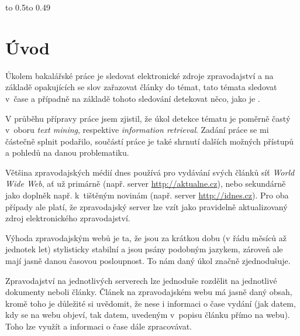 \documentclass[12pt,a4paper]{report}
\let\openright=\clearpage
\begin{document}
\vbox to 0.5\vsize{
\setlength\parindent{0mm}
\setlength\parskip{5mm}

\kecycz{}

\vss}\nobreak\vbox to 0.49\vsize{
\setlength\parindent{0mm}
\setlength\parskip{5mm}

\kecyen{}

\vss}




\newpage


\openright
\pagestyle{plain}
\setcounter{page}{1}
\tableofcontents

\chapter{Úvod}

Úkolem bakalářské práce je sledovat elektronické zdroje zpravodajství a na zá\-klad\-ě opakujících se slov zařazovat články do témat, tato témata sledovat v~čase a případně na základě tohoto sledování detekovat něco, jako je .

V průběhu přípravy práce jsem zjistil, že úkol detekce tématu je poměrně častý v~oboru \emph{text mining}, respektive \emph{information retrieval}. Zadání práce se mi částečně splnit podařilo, součástí práce je také shrnutí dalších možných přístupů a pohledů na danou problematiku.

Většina zpravodajských médií dnes používá pro vydávání svých článků síť \emph{World Wide Web}, ať už primárně (např. server \url{http://aktualne.cz}), nebo sekundárně jako doplněk např. k~tištěným novinám (např. server \url{http://idnes.cz}). Pro oba případy ale platí, že zpravodajský server lze vzít jako pravidelně aktualizovaný zdroj elektronického zpravodajství.

Výhoda zpravodajským webů je ta, že jsou za krátkou dobu (v řádu měsíců až jednotek let) stylisticky stabilní a jsou psány podobným jazykem, zároveň ale mají jasně danou časovou posloupnost. To nám daný úkol značně zjednodušuje.

Zpravodajství na jednotlivých serverech lze jednoduše rozdělit na jednotlivé dokumenty neboli články. Článek na zpravodajském webu má jasně daný obsah, kromě toho je důležité si uvědomit, že nese i informaci o čase vydání (jak datem, kdy se na webu objeví, tak datem, uvedeným v~popisu článku přímo na webu). Toho lze využít a informaci o čase dále zpracovávat.
\end{document}
